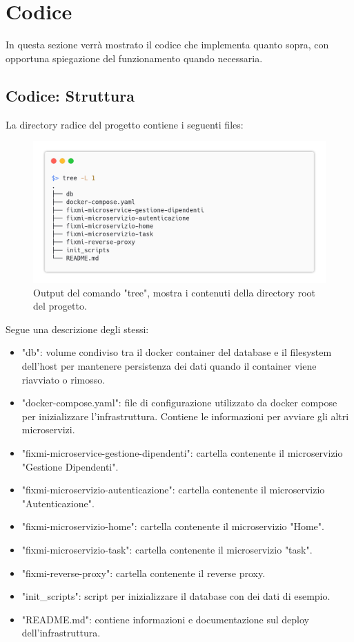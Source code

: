 \documentclass{report}
\begin{document}
\section{Codice}
In questa sezione verrà mostrato il codice che implementa quanto sopra, con opportuna spiegazione del funzionamento quando necessaria.

\subsection{Codice: Struttura}

La directory radice del progetto contiene i seguenti files:

\begin{figure}[H]
	\centering\includegraphics[width=1\textwidth]{images/tree.png}
    Output del comando "tree", mostra i contenuti della directory root del progetto.
\end{figure}

Segue una descrizione degli stessi:
\begin{itemize}
	\item "db": volume condiviso tra il docker container del database e il filesystem dell'host per mantenere persistenza dei dati quando il container viene riavviato o rimosso.
	\item "docker-compose.yaml": file di configurazione utilizzato da docker compose per inizializzare l'infrastruttura. Contiene le informazioni per avviare gli altri microservizi.
	\item "fixmi-microservice-gestione-dipendenti": cartella contenente il microservizio "Gestione Dipendenti".
	\item "fixmi-microservizio-autenticazione": cartella contenente il microservizio "Autenticazione".
	\item "fixmi-microservizio-home": cartella contenente il microservizio "Home".
	\item "fixmi-microservizio-task": cartella contenente il microservizio "task".
	\item "fixmi-reverse-proxy": cartella contenente il reverse proxy.
	\item "init\_scripts": script per inizializzare il database con dei dati di esempio.
	\item "README.md": contiene informazioni e documentazione sul deploy dell'infrastruttura.
\end{itemize}
\end{document}
